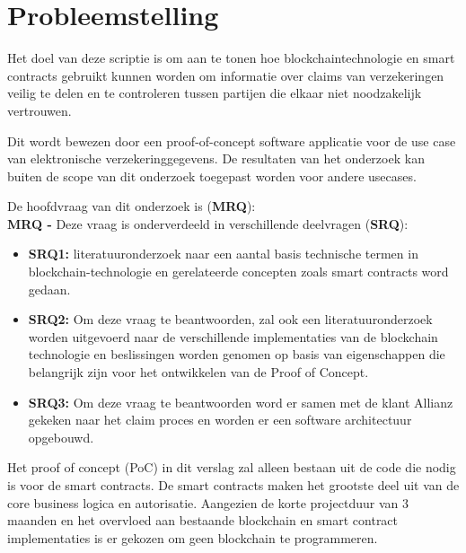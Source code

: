 \newpage

\section{Probleemstelling}\label{chap:researchQuestions}
Het doel van deze scriptie is om aan te tonen hoe blockchaintechnologie en smart contracts gebruikt kunnen worden om informatie over claims van verzekeringen veilig te delen en te controleren tussen partijen die elkaar niet noodzakelijk vertrouwen.\par
Dit wordt bewezen door een proof-of-concept software applicatie voor de use case van elektronische verzekeringgegevens. De resultaten van het onderzoek kan buiten de scope van dit onderzoek toegepast worden voor andere usecases.
\par
De hoofdvraag van dit onderzoek is (\textbf{MRQ}):\\
\textbf{MRQ - \researchQuestionMain} Deze vraag is onderverdeeld in verschillende deelvragen (\textbf{SRQ}):
\begin{itemize}
	\item \textbf{SRQ1: \researchQuestionOne} literatuuronderzoek naar een aantal basis technische termen in blockchain-technologie en gerelateerde concepten zoals smart contracts word gedaan.
  \item \textbf{SRQ2: \researchQuestionTwo} Om deze vraag te beantwoorden, zal ook een literatuuronderzoek worden uitgevoerd naar de verschillende implementaties van de blockchain technologie en beslissingen worden genomen op basis van eigenschappen die belangrijk zijn voor het ontwikkelen van de Proof of Concept.
  \item \textbf{SRQ3: \researchQuestionThree} Om deze vraag te beantwoorden word er samen met de klant Allianz gekeken naar het claim proces en worden er een software architectuur opgebouwd.
\end{itemize}

Het proof of concept (PoC) in dit verslag zal alleen bestaan uit de code die nodig is voor de smart contracts. De smart contracts maken het grootste deel uit van de core business logica en autorisatie. Aangezien de korte projectduur van 3 maanden en het overvloed aan bestaande blockchain en smart contract implementaties is er gekozen om geen blockchain te programmeren.
\newpage